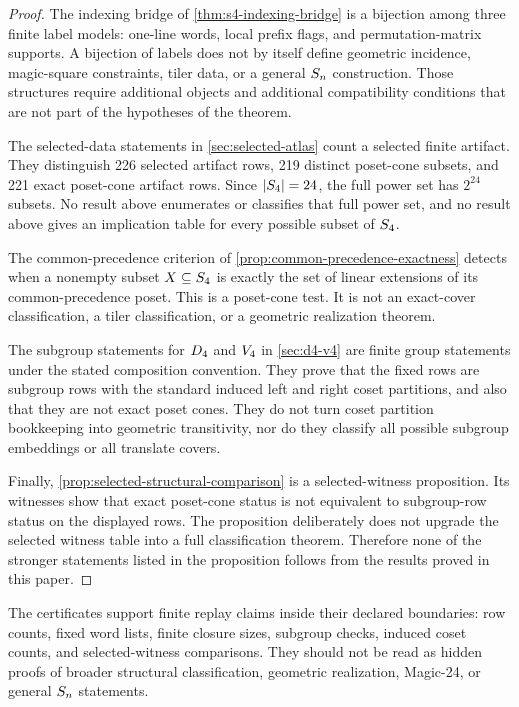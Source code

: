 \begin{proof}
The indexing bridge of \cref{thm:s4-indexing-bridge} is a bijection among three finite label models: one-line words, local prefix flags, and permutation-matrix supports. A bijection of labels does not by itself define geometric incidence, magic-square constraints, tiler data, or a general \(S_n\) construction. Those structures require additional objects and additional compatibility conditions that are not part of the hypotheses of the theorem.

The selected-data statements in \cref{sec:selected-atlas} count a selected finite artifact. They distinguish 226 selected artifact rows, 219 distinct poset-cone subsets, and 221 exact poset-cone artifact rows. Since \(|S_4|=24\), the full power set has \(2^{24}\) subsets. No result above enumerates or classifies that full power set, and no result above gives an implication table for every possible subset of \(S_4\).

The common-precedence criterion of \cref{prop:common-precedence-exactness} detects when a nonempty subset \(X\subseteq S_4\) is exactly the set of linear extensions of its common-precedence poset. This is a poset-cone test. It is not an exact-cover classification, a tiler classification, or a geometric realization theorem.

The subgroup statements for \(D_4\) and \(V_4\) in \cref{sec:d4-v4} are finite group statements under the stated composition convention. They prove that the fixed rows are subgroup rows with the standard induced left and right coset partitions, and also that they are not exact poset cones. They do not turn coset partition bookkeeping into geometric transitivity, nor do they classify all possible subgroup embeddings or all translate covers.

Finally, \cref{prop:selected-structural-comparison} is a selected-witness proposition. Its witnesses show that exact poset-cone status is not equivalent to subgroup-row status on the displayed rows. The proposition deliberately does not upgrade the selected witness table into a full classification theorem. Therefore none of the stronger statements listed in the proposition follows from the results proved in this paper.
\end{proof}

\begin{remark}
\label{rem:certificate-boundary}
The certificates support finite replay claims inside their declared boundaries: row counts, fixed word lists, finite closure sizes, subgroup checks, induced coset counts, and selected-witness comparisons. They should not be read as hidden proofs of broader structural classification, geometric realization, Magic-24, or general \(S_n\) statements.
\end{remark}